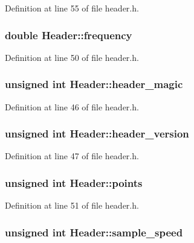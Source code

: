 Definition at line 55 of file header.h.\hypertarget{structHeader_a9d7ecc5126a657a40335da72f3a2ea8c}{
\subsubsection[{frequency}]{\setlength{\rightskip}{0pt plus 5cm}double {\bf Header::frequency}}}
\label{structHeader_a9d7ecc5126a657a40335da72f3a2ea8c}


Definition at line 50 of file header.h.\hypertarget{structHeader_a76d42241732e2ac2bf57bdd38dbe23f6}{
\subsubsection[{header\_\-magic}]{\setlength{\rightskip}{0pt plus 5cm}unsigned int {\bf Header::header\_\-magic}}}
\label{structHeader_a76d42241732e2ac2bf57bdd38dbe23f6}


Definition at line 46 of file header.h.\hypertarget{structHeader_ac390c4008157e7523e4f8f562b4ef9c2}{
\subsubsection[{header\_\-version}]{\setlength{\rightskip}{0pt plus 5cm}unsigned int {\bf Header::header\_\-version}}}
\label{structHeader_ac390c4008157e7523e4f8f562b4ef9c2}


Definition at line 47 of file header.h.\hypertarget{structHeader_ac8eec35b5a87d9536e73872420d4c933}{
\subsubsection[{points}]{\setlength{\rightskip}{0pt plus 5cm}unsigned int {\bf Header::points}}}
\label{structHeader_ac8eec35b5a87d9536e73872420d4c933}


Definition at line 51 of file header.h.\hypertarget{structHeader_a1162598c019db96cc5feb7e001c89445}{
\subsubsection[{sample\_\-speed}]{\setlength{\rightskip}{0pt plus 5cm}unsigned int {\bf Header::sample\_\-speed}}}
\label{structHeader_a1162598c019db96cc5feb7e001c89445}


